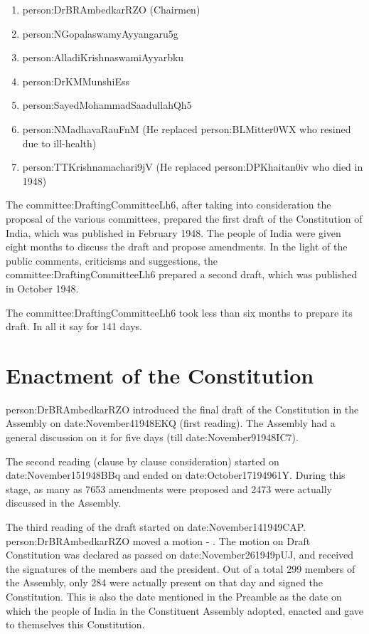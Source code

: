 \begin{enumerate}
  \item \gls{person:DrBRAmbedkarRZO} ({ Chairmen})
  \item \gls{person:NGopalaswamyAyyangaru5g}
  \item \gls{person:AlladiKrishnaswamiAyyarbku}
  \item \gls{person:DrKMMunshiEss}
  \item \gls{person:SayedMohammadSaadullahQh5}
  \item \gls{person:NMadhavaRauFnM} (He replaced \gls{person:BLMitter0WX} who resined due to ill-health)
  \item \gls{person:TTKrishnamachari9jV} (He replaced \gls{person:DPKhaitan0iv} who died in 1948)
\end{enumerate}

The \gls{committee:DraftingCommitteeLh6}, after taking into consideration the proposal of the various committees, prepared the first draft of the Constitution of India, which was published in February 1948. The people of India were given eight months to discuss the draft and propose amendments. In the light of the public comments, criticisms and suggestions, the \gls{committee:DraftingCommitteeLh6} prepared a second draft, which was published in October 1948.

The \gls{committee:DraftingCommitteeLh6} took less than six months to prepare its draft. In all it say for 141 days.

\section{Enactment of the Constitution}

\gls{person:DrBRAmbedkarRZO} introduced the final draft of the Constitution in the Assembly on \gls{date:November41948EKQ} (first reading). The Assembly had a general discussion on it for five days (till \gls{date:November91948IC7}).

The second reading (clause by clause consideration) started on \gls{date:November151948BBq} and ended on \gls{date:October17194961Y}. During this stage, as many as 7653 amendments were proposed and 2473 were actually discussed in the Assembly.

The third reading of the draft started on \gls{date:November141949CAP}. \gls{person:DrBRAmbedkarRZO} moved a motion - . The motion on Draft Constitution was declared as passed on \gls{date:November261949pUJ}, and received the signatures of the members and the president. Out of a total 299 members of the Assembly, only 284 were actually present on that day and signed the Constitution. This is also the date mentioned in the Preamble as the date on which the people of India in the Constituent Assembly adopted, enacted and gave to themselves this Constitution.


